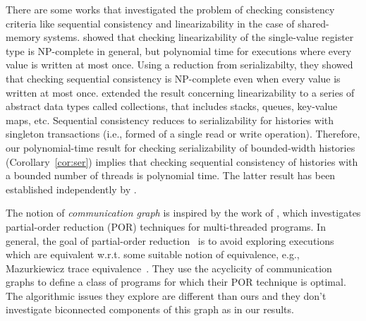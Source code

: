There are some works that investigated the problem of checking consistency criteria like sequential consistency and linearizability in the case of shared-memory systems. \cite{DBLP:journals/siamcomp/GibbonsK97} showed that checking linearizability of the single-value register type is NP-complete in general, but polynomial time for executions where every value is written at most once. Using a reduction from serializabilty, they showed that checking sequential consistency is NP-complete even when every value is written at most once. \cite{DBLP:journals/pacmpl/EmmiE18} extended the result concerning linearizability to a series of abstract data types called collections, that includes stacks, queues, key-value maps, etc. Sequential consistency reduces to serializability for histories with singleton transactions (i.e., formed of a single read or write operation). Therefore, our polynomial-time result for checking serializability of bounded-width histories (Corollary~\ref{cor:ser}) implies that checking sequential consistency of histories with a bounded number of threads is polynomial time. The latter result has been established independently by \cite{DBLP:journals/pacmpl/AbdullaAJLNS19}.

The notion of \emph{communication graph} is inspired by the work of \cite{DBLP:journals/pacmpl/ChalupaCPSV18}, which investigates partial-order reduction (POR) techniques for multi-threaded programs. In general, the goal of partial-order reduction~\cite{DBLP:conf/popl/FlanaganG05} is to avoid exploring executions which are equivalent w.r.t. some suitable notion of equivalence, e.g., Mazurkiewicz trace equivalence~\cite{DBLP:conf/ac/Mazurkiewicz86}. They use the acyclicity of communication graphs to define a class of programs for which their POR technique is optimal. The algorithmic issues they explore are different than ours and they don't investigate biconnected components of this graph as in our results.
